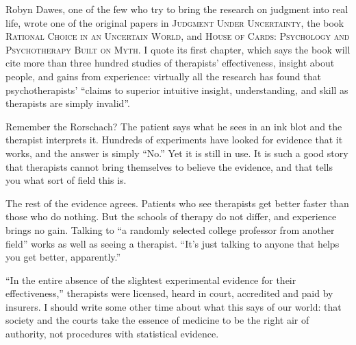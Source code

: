 
Robyn Dawes, one of the few who try to bring the research on judgment into real life, wrote one of the original papers in \textsc{Judgment Under Uncertainty}, the book \textsc{Rational Choice in an Uncertain World}, and \textsc{House of Cards: Psychology and Psychotherapy Built on Myth}. I quote its first chapter, which says the book will cite more than three hundred studies of therapists' effectiveness, insight about people, and gains from experience: virtually all the research has found that psychotherapists' ``claims to superior intuitive insight, understanding, and skill as therapists are simply invalid''. 

Remember the Rorschach? The patient says what he sees in an ink blot and the therapist interprets it. Hundreds of experiments have looked for evidence that it works, and the answer is simply ``No.'' Yet it is still in use.  It is such a good story that therapists cannot bring themselves to believe the evidence, and that tells you what sort of field this is.

The rest of the evidence agrees. Patients who see therapists get better faster than those who do nothing. But the schools of therapy do not differ, and experience brings no gain.  Talking to ``a randomly selected college professor from another field'' works as well as seeing a therapist. ``It's just talking to anyone that helps you get better, apparently.'' 

``In the entire absence of the slightest experimental evidence for their effectiveness,'' therapists were licensed, heard in court, accredited and paid by insurers.  I should write some other time about what this says of our world: that society and the courts take the essence of medicine to be the right air of authority, not procedures with statistical evidence.

